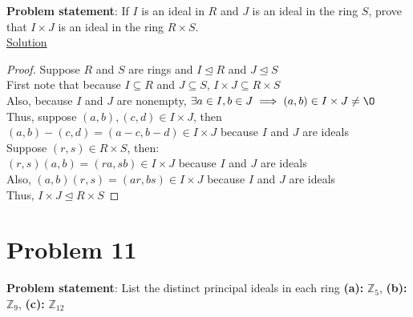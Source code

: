 \documentclass{article} %
\begin{document}
\textbf{Problem statement}: If $I$ is an ideal in $R$ and $J$ is an ideal in the ring $S$, prove that $I\times J$ is an ideal in the ring $R\times S$.
\\

\underline{Solution}
\begin{addmargin}[1em]{0em}
\begin{proof}
Suppose $R$ and $S$ are rings and $I \unlhd R$ and $J \unlhd S$
\\First note that because $I \subseteq R$ and $J \subseteq S$, $I \times J \subseteq R \times S$
\\Also, because $I$ and $J$ are nonempty, $\exists a \in I, b \in J \implies (a,b) \in I \times J \neq \O$
\\Thus, suppose $(a,b), (c,d) \in I \times J$, then $(a,b) - (c,d) = (a-c,b-d) \in I \times J$ because $I$ and $J$ are ideals
\\Suppose $(r,s) \in R \times S$, then:
\\$(r,s)(a,b) = (ra, sb) \in I \times J$ because $I$ and $J$ are ideals
\\Also, $(a,b)(r,s) = (ar, bs) \in I \times J$ because $I$ and $J$ are ideals
\\Thus, $I \times J \unlhd R \times S$
\end{proof}
\end{addmargin}

\newpage

\section*{Problem 11}


\textbf{Problem statement}: List the distinct principal ideals in each ring \textbf{(a):} $\mathbb{Z}_5$, \textbf{(b):} $\mathbb{Z}_9$, \textbf{(c):} $\mathbb{Z}_{12}$
\\
\end{document}
